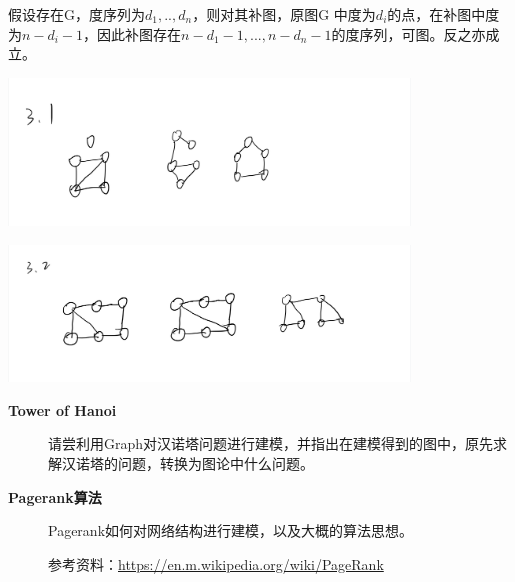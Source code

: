 \documentclass[a4paper, justified]{tufte-handout}
\begin{document}
\begin{problem}[CZ 2.31]
\end{problem}

\begin{solution}
	假设存在G，度序列为$d_1,..,d_n$，则对其补图，原图G 中度为$d_i$的点，在补图中度为$n-d_i-1$，因此补图存在$n-d_1-1,...,n-d_n-1$的度序列，可图。反之亦成立。
\end{solution}

\begin{problem}[CZ 3.1]
\end{problem}

\begin{solution}
	\includegraphics[width = 0.8\textwidth]{3.1.jpg}
\end{solution}

\begin{problem}[CZ 3.2]
\end{problem}

\begin{solution}
	\includegraphics[width = 0.8\textwidth]{3.2.jpg}
\end{solution}

\beginoptional

%

\beginot
\begin{ot}[图的应用-1]
	\begin{description}
		\item[\textbf{Tower of Hanoi}] 请尝利用Graph对汉诺塔问题进行建模，并指出在建模得到的图中，原先求解汉诺塔的问题，转换为图论中什么问题。
		\item[\textbf{Pagerank算法}]
			Pagerank如何对网络结构进行建模，以及大概的算法思想。

			参考资料：\href{https://en.m.wikipedia.org/wiki/PageRank}{https://en.m.wikipedia.org/wiki/PageRank}
	\end{description}
\end{ot}
\end{document}
